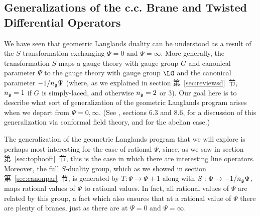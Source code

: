 
\subsection{Generalizations of the c.c. Brane and Twisted Differential
Operators}\label{sec:genotics}

We have seen that geometric Langlands duality can be understood as
a result of the $S$-transformation exchanging $\Psi=0$ and
$\Psi=\infty$. More generally, the transformation $S$ maps a gauge
theory with gauge group $G$ and canonical parameter $\Psi$ to the
gauge theory with gauge group $\LG$ and the canonical parameter
$-1/n_{\frak g}\Psi$ (where, as we explained in section 第~\ref{sec:reviewsd}~节,
$n_{\frak g}=1$ if $G$ is simply-laced, and otherwise $n_{\frak
g}=2$ or 3). Our goal here is to describe what sort of
generalization of the geometric Langlands program arises when we
depart from $\Psi=0,\infty$. (See \cite{ref9}, sections 6.3 and 8.6,
for a discussion of this generalization via conformal field
theory, and \cite{ref146} for the abelian case.)

The generalization of the geometric Langlands program that we will
explore is perhaps most interesting for the case of rational
$\Psi$, since, as we saw in section 第~\ref{sec:tophooft}~节, this is the case in
which there are interesting line operators. Moreover, the full
$S$-duality group, which as we showed in section 第~\ref{sec:canonpar}~节, is
generated by $T:\Psi\to\Psi+1$ along with $S:\Psi\to -1/n_{\frak
g}\Psi$, maps rational values of $\Psi$ to rational values. In
fact, all rational values of $\Psi$ are related by this group, a
fact which also ensures that at a rational value of $\Psi$ there
are plenty of branes, just as there are at $\Psi=0$ and
$\Psi=\infty$.

